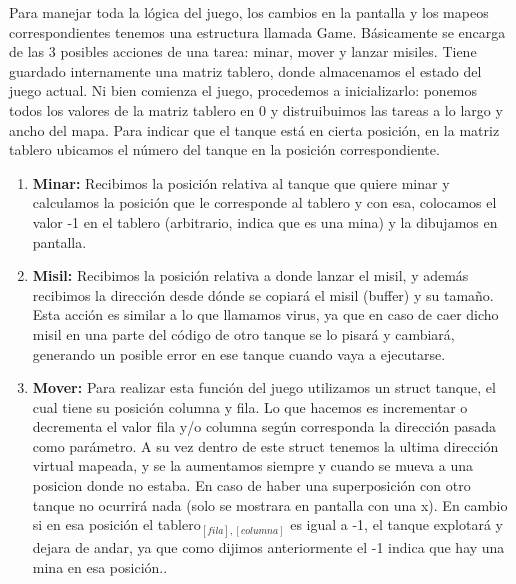 Para manejar toda la lógica del juego, los cambios en la pantalla y los mapeos correspondientes tenemos una estructura
llamada Game. Básicamente se encarga de las 3 posibles acciones de una tarea: minar, mover y lanzar misiles.
Tiene guardado internamente una matriz tablero, donde almacenamos el estado del juego actual. 
Ni bien comienza el juego, procedemos a inicializarlo: ponemos todos los valores de la matriz tablero en 0
y distruibuimos las tareas a lo largo y ancho del mapa. Para indicar que el tanque está en cierta posición,
en la matriz tablero ubicamos el número del tanque en la posición correspondiente.

\begin{enumerate}
 \item \textbf{Minar:} Recibimos la posición relativa al tanque que quiere minar y calculamos la posición que le corresponde
 al tablero y con esa, colocamos el valor -1 en el tablero (arbitrario, indica que es una mina) y la dibujamos en pantalla.
 \item \textbf{Misil:} Recibimos la posición relativa a donde lanzar el misil, y además recibimos la dirección desde dónde se copiará el misil (buffer)
 y su tamaño.
 Esta acción es similar a lo que llamamos virus, ya que en caso de caer dicho misil en una parte del código de otro tanque se lo pisará y cambiará,
 generando un posible error en ese tanque cuando vaya a ejecutarse.
 \item \textbf{Mover:} Para realizar esta función del juego utilizamos un struct tanque, el cual tiene su posición columna y fila.
 Lo que hacemos es incrementar o decrementa el valor fila y/o columna según corresponda la dirección pasada como parámetro.
 A su vez dentro de este struct tenemos la ultima dirección virtual mapeada, y se la aumentamos siempre y cuando se mueva a una posicion donde no estaba.
 En caso de haber una superposición con otro tanque no ocurrirá nada (solo se mostrara en pantalla con una x). En cambio si en esa posición 
 el tablero$_{[fila],[columna]}$ es igual a -1, el tanque explotará y dejara de andar, ya que como dijimos anteriormente el -1 indica 
 que hay una mina en esa posición..
\end{enumerate}
